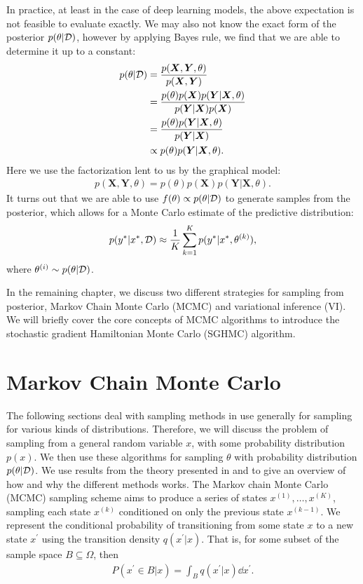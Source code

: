 In practice, at least in the case of deep learning models, the above expectation is not feasible to evaluate exactly.
We may also not know the exact form of the posterior $p(\theta|\mathcal{D})$, however by applying Bayes rule, we find that we are able to determine it up to a constant:
\begin{align} 
        p(\theta | \mathcal{D}) 
        &= \frac{p(\bm X , \bm Y, \theta)}{p(\bm{X}, \bm{Y})}\\
        &= \frac{p(\theta) p(\bm X) p(\bm Y | \bm X, \theta)}{p(\bm{Y}|\bm{X})p(\bm{X})} \\
        &= \frac{p(\theta) p(\bm Y | \bm X, \theta)}{p(\bm{Y}|\bm{X})} \label{eq:posterior} \\ 
        &\propto p(\theta) p(\bm Y | \bm X, \theta).
\end{align}
Here we use the factorization lent to us by the graphical model:
\begin{align}
    p(\bm X, \bm Y, \theta) = p(\theta) p(\bm X) p(\bm Y | \bm X, \theta).
\end{align}
It turns out that we are able to use $f(\theta) \propto p(\theta | \mathcal{D})$ to generate samples from the posterior, which allows for a Monte Carlo estimate of the predictive distribution:
\begin{align}
    p(y^\ast | x^\ast, \mathcal{D})  \approx \frac{1}{K} \sum_{k=1}^K p(y^\ast | x^\ast, \theta^{(k)}),
\end{align}
where $\theta^{(i)}\sim p(\theta | \mathcal{D})$.

In the remaining chapter, we discuss two different strategies for sampling from posterior, Markov Chain Monte Carlo (MCMC) and variational inference (VI).
We will briefly cover the core concepts of MCMC algorithms to introduce the stochastic gradient Hamiltonian Monte Carlo (SGHMC) algorithm.

\section{Markov Chain Monte Carlo}
The following sections deal with sampling methods in use generally for sampling for various kinds of distributions. 
Therefore, we will discuss the problem of sampling from a general random variable $x$, with some probability distribution $p(x)$.
We then use these algorithms for sampling $\theta$ with probability distribution $p(\theta|\mathcal{D})$.
We use results from the theory presented in \autocite{bishop_pattern_2006} and \autocite{li_markov_2010} to give an overview of how and why the different methods works. 
The Markov chain Monte Carlo (MCMC) sampling scheme aims to produce a series of states $x^{(1)},\dots,x^{(K)}$, sampling each state $x^{(k)}$ conditioned on only the previous state $x^{(k-1)}$. 
We represent the conditional probability of transitioning from some state $x$ to a new state $x^\prime$ using the transition density $q(x^\prime | x)$.
That is, for some subset of the sample space $B\subseteq \Omega$, then 
\begin{align}    
    P(x^\prime \in B|x)=\int_{B}q(x^\prime | x)\dd{x^\prime}.
\end{align}

